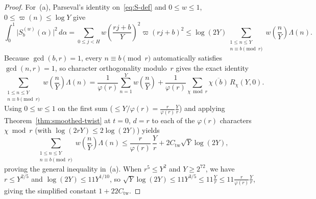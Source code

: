 \documentclass[11pt,reqno]{amsart}
\numberwithin{equation}{section}
\theoremstyle{definition}
\newcommand{\1}{\mathbf{1}}
\begin{document}
\begin{proof}
For~(a), Parseval's identity on~\eqref{eq:S-def} and $0 \le w \le 1$, $0 \le \varpi(n) \le \log Y$ give
\[
  \int_0^1 \bigl|S_b^{(w)}(\alpha)\bigr|^2\,d\alpha
  = \sum_{0 \le j < H} w\!\left(\frac{rj+b}{Y}\right)^2 \varpi(rj+b)^2
  \le \log(2Y) \sum_{\substack{1 \le n \le Y \\ n \equiv b \pmod r}} w\!\left(\frac{n}{Y}\right) \Lambda(n).
\]
Because $\gcd(b, r) = 1$, every $n \equiv b \pmod r$ automatically satisfies $\gcd(n, r) = 1$, so character orthogonality modulo~$r$ gives the exact identity
\[
  \sum_{\substack{1 \le n \le Y \\ n \equiv b \pmod r}} w\!\left(\frac{n}{Y}\right) \Lambda(n)
  = \frac{1}{\varphi(r)}\sum_{n=1}^Y w\!\left(\frac{n}{Y}\right)
    + \frac{1}{\varphi(r)}\sum_{\chi \bmod r} \overline{\chi(b)}\, R_\chi(Y, 0).
\]
Using $0 \le w \le 1$ on the first sum ($\le Y/\varphi(r) = \frac{r}{\varphi(r)}\frac{Y}{r}$) and applying Theorem~\ref{thm:smoothed-twist} at $t = 0$, $d = r$ to each of the $\varphi(r)$ characters $\chi \bmod r$ (with $\log(2rY) \le 2\log(2Y)$) yields
\[
  \sum_{\substack{1 \le n \le Y \\ n \equiv b \pmod r}} w\!\left(\frac{n}{Y}\right) \Lambda(n)
  \le \frac{r}{\varphi(r)}\,\frac{Y}{r} + 2 C_{\mathrm{tw}} \sqrt{Y}\log(2Y),
\]
proving the general inequality in~(a). When $r^5 \le Y^2$ and $Y \ge 2^{72}$, we have $r \le Y^{2/5}$ and $\log(2Y) \le 11 Y^{1/10}$, so $\sqrt{Y}\log(2Y) \le 11 Y^{3/5} \le 11 \frac{Y}{r} \le 11 \frac{r}{\varphi(r)}\frac{Y}{r}$, giving the simplified constant $1 + 22 C_{\mathrm{tw}}$.


\end{proof}
\end{document}
